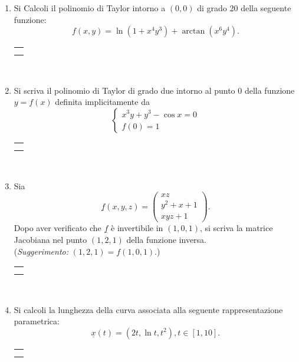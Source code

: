 \documentclass[12pt,a4paper]{report}\pagenumbering{roman}
\begin{document}
\begin{enumerate}
\item Si Calcoli il polinomio di Taylor intorno a $(0,0)$ di grado 20
della seguente funzione:
$$f(x,y)=\ln(1+x^4y^3)+\arctan(x^6y^4).$$
\hspace*{-3.5cm}\begin{tabular}{c}\hline\\\hspace*{16cm}\end{tabular}\\
\hspace*{-3.5cm}{\bf SVOLGIMENTO:}\pagebreak

\item Si scriva il polinomio di Taylor di grado due intorno al punto $0$
della funzione $y=f(x)$ definita implicitamente da
$$\left\{\begin{array}{l}
x^3y+y^3-\cos x=0\\
f(0)=1
\end{array}\right.$$
\hspace*{-3.5cm}\begin{tabular}{c}\hline\\\hspace*{16cm}\end{tabular}\\
\hspace*{-3.5cm}{\bf SVOLGIMENTO:}\pagebreak

\item  Sia
$$\underline{f}(x,y,z)=\left(\begin{array}{l}
xz\\
y^2+x+1\\
xyz+1\end{array}
\right).$$ 
Dopo aver verificato che $\underline{f}$ \`e invertibile in $(1,0,1)$,
si scriva la matrice Jacobiana nel punto $(1,2,1)$ della
funzione inversa.\\
({\it Suggerimento:} $(1,2,1)=f(1,0,1)$.)

\hspace*{-3.5cm}\begin{tabular}{c}\hline\\\hspace*{16cm}\end{tabular}\\
\hspace*{-3.5cm}{\bf SVOLGIMENTO:}\pagebreak

\item Si calcoli la lunghezza della curva associata alla seguente rappresentazione 
parametrica:
$$\underline{x}(t)=\left(2t,\ln t,t^2\right), t\in[1,10].$$
\hspace*{-3.5cm}\begin{tabular}{c}\hline\\\hspace*{16cm}\end{tabular}\\
\hspace*{-3.5cm}{\bf SVOLGIMENTO:}\pagebreak


\end{enumerate}
\end{document}
